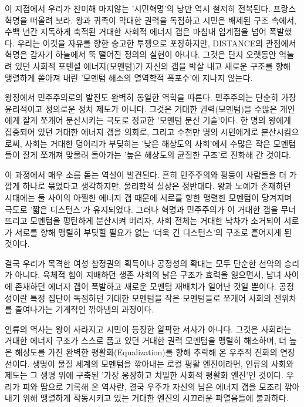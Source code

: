 이 지점에서 우리가 찬미해 마지않는 '시민혁명'의 낭만 역시 철저히 전복된다. 프랑스 혁명을 떠올려 보라. 왕과 귀족이 막대한 권력을 독점하고 시민은 배제된 구조 속에서, 수백 년간 지독하게 축적된 거대한 사회적 에너지 갭은 마침내 임계점을 넘어 폭발했다. 우리는 이것을 자유를 향한 숭고한 투쟁으로 포장하지만, DISTANCE의 관점에서 혁명은 갑자기 하늘에서 뚝 떨어진 정의의 실현이 아니다. 그것은 단지 오랫동안 억눌려 있던 사회적 포텐셜 에너지(모멘텀)가 자신의 갭을 박살 내고 새로운 구조를 향해 맹렬하게 쏟아져 내린 '모멘텀 해소의 열역학적 폭포수'에 지나지 않는다.

왕정에서 민주주의로의 발전도 완벽히 동일한 역학을 따른다. 민주주의는 단순히 가장 윤리적이고 정의로운 정치 제도가 아니다. 그것은 거대한 권력(모멘텀)을 수많은 개인에게 잘게 쪼개어 분산시키는 극도로 정교한 '모멘텀 분산 기술'이다. 한 명의 왕에게 집중되어 있던 거대한 에너지 갭을 의회로, 그리고 수천만 명의 시민에게로 분산시킴으로써, 사회는 거대한 덩어리가 부딪히는 '낮은 해상도의 사회'에서 수많은 작은 모멘텀들이 잘게 쪼개져 맞물려 돌아가는 '높은 해상도의 균질한 구조'로 진화해 간 것이다.

이 과정에서 매우 소름 돋는 역설이 발견된다. 흔히 민주주의와 평등이 사람들을 더 가깝게 하나로 묶었다고 생각하지만, 물리학적 실상은 정반대다. 왕과 노예가 존재하던 시대에는 둘 사이의 아찔한 에너지 갭 때문에 서로를 향한 맹렬한 모멘텀이 당겨지며 극도로 '짧은 디스턴스'가 유지되었다. 그러나 혁명과 민주주의가 이 거대한 갭을 무너뜨리고 모멘텀을 평탄하게 분산시켜 버리자, 사회 전체는 거대한 낙차가 소거되어 서로가 서로를 향해 맹렬히 부딪힐 필요가 없는 '더욱 긴 디스턴스'의 구조로 흩어지게 된 것이다.

결국 우리가 목격한 여성 참정권의 획득이나 공정성의 확대는 모두 단순한 선악의 승리가 아니다. 육체적 힘이 지배하던 생존 사회의 낡은 구조가 효력을 잃으면서, 남녀 사이에 존재하던 에너지 갭이 폭발하고 새로운 모멘텀 재배치가 일어난 것일 뿐이다. 공정성이란 특정 집단이 독점하던 거대한 모멘텀을 작은 모멘텀들로 쪼개어 사회의 전위차를 줄여나가는 기계적인 깎아냄의 과정이다.

인류의 역사는 왕이 사라지고 시민이 등장한 얄팍한 서사가 아니다. 그것은 사회라는 거대한 에너지 구조가 스스로 품고 있던 거대한 권력 모멘텀을 맹렬히 해소하며, 더 높은 해상도를 가진 완벽한 평활화(Equalization)를 향해 추락해 온 우주적 진화의 연장선이다. 생명이 물질 세계의 모멘텀을 깎아내는 로컬 평활 엔진이라면, 인류의 사회와 제도는 그 생명 위에 구축된 '가장 웅장하고 치밀한 사회적 평활화 엔진'인 것이다. 우리가 피와 땀으로 기록해 온 역사란, 결국 우주가 자신의 남은 에너지 갭을 모조리 깎아내기 위해 맹렬하게 작동시키고 있는 거대한 엔진의 시끄러운 파열음들에 불과하다.
